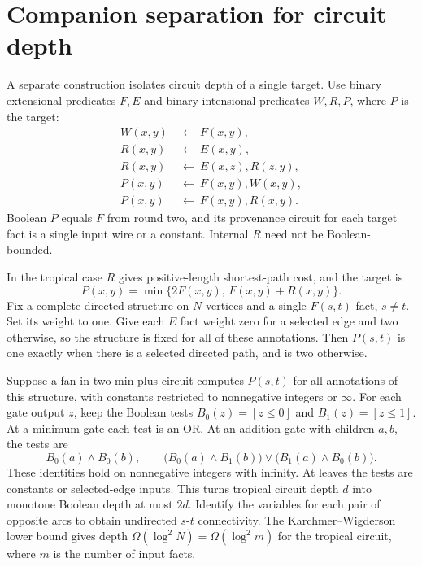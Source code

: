 \documentclass[11pt]{amsart}
\begin{document}
\section{Companion separation for circuit depth}
A separate construction isolates circuit depth of a single
target. Use binary extensional predicates \(F,E\) and binary
intensional predicates \(W,R,P\), where \(P\) is the target:
\[
\begin{aligned}
 W(x,y)&\ \leftarrow\ F(x,y),\\
 R(x,y)&\ \leftarrow\ E(x,y),\\
 R(x,y)&\ \leftarrow\ E(x,z),R(z,y),\\
 P(x,y)&\ \leftarrow\ F(x,y),W(x,y),\\
 P(x,y)&\ \leftarrow\ F(x,y),R(x,y).
\end{aligned}
\]
Boolean \(P\) equals \(F\) from round two, and its provenance
circuit for each target fact is a single input wire or a
constant. Internal \(R\) need not be Boolean-bounded.

In the tropical case \(R\) gives positive-length shortest-path
cost, and the target is
\[
       P(x,y)=\min\{2F(x,y),\,F(x,y)+R(x,y)\}.
\]
Fix a complete directed structure on \(N\) vertices and a single
\(F(s,t)\) fact, \(s\ne t\). Set its weight to one. Give each
\(E\) fact weight zero for a selected edge and two otherwise,
so the structure is fixed for all of these annotations.
Then \(P(s,t)\) is one exactly when there is a selected directed
path, and is two otherwise.

Suppose a fan-in-two min-plus circuit computes \(P(s,t)\) for
all annotations of this structure, with constants restricted
to nonnegative integers or \(\infty\). For each gate output
\(z\), keep the Boolean tests \(B_0(z)=[z\le0]\) and
\(B_1(z)=[z\le1]\). At a minimum gate each test is an OR. At
an addition gate with children \(a,b\), the tests are
\[
 B_0(a)\land B_0(b),\qquad
 \bigl(B_0(a)\land B_1(b)\bigr)
 \lor\bigl(B_1(a)\land B_0(b)\bigr).
\]
These identities hold on nonnegative integers with infinity.
At leaves the tests are constants or selected-edge inputs.
This turns tropical circuit depth \(d\) into monotone Boolean
depth at most \(2d\). Identify the variables for each pair of
opposite arcs to obtain undirected \(s\)-\(t\) connectivity.
The Karchmer--Wigderson lower bound \cite{kw} gives depth
\(\Omega(\log^2 N)=\Omega(\log^2 m)\) for the tropical circuit,
where \(m\) is the number of input facts.
\end{document}

